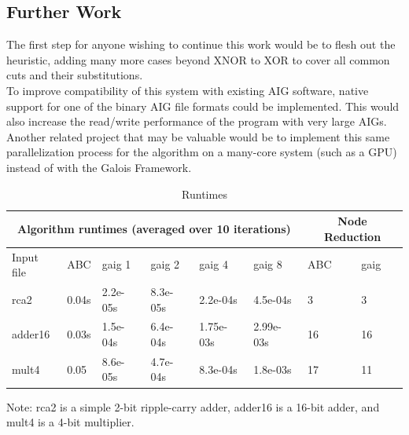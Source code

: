 \documentclass[twocolumn]{article}
\begin{document}
\subsection{Further Work}
The first step for anyone wishing to continue this work would be to flesh out the heuristic, adding many more cases beyond XNOR to XOR to cover all common cuts and their substitutions.\\\indent
To improve compatibility of this system with existing AIG software, native support for one of the binary AIG file formats could be implemented. This would also increase the read/write performance of the program with very large AIGs.\\\indent
Another related project that may be valuable would be to implement this same parallelization process for the algorithm on a many-core system (such as a GPU) instead of with the Galois Framework.


\onecolumn
\begin {table}[T]
\caption {Runtimes} \label{tab:title}
\begin{center}
\begin{tabular}{ |p{2cm}|p{2cm}|p{2cm}|p{2cm}|p{2cm}|p{2cm}|p{1cm}|p{1cm}| }
\hline
\multicolumn{6}{|c|}{Algorithm runtimes (averaged over 10 iterations)} & \multicolumn{2}{|c|}{Node Reduction}\\
\hline
Input file & ABC & gaig 1 & gaig 2 & gaig 4 & gaig 8 & ABC & gaig\\
\hline
rca2 & 0.04s & 2.2e-05s & 8.3e-05s & 2.2e-04s & 4.5e-04s & 3 & 3\\
adder16 & 0.03s & 1.5e-04s & 6.4e-04s & 1.75e-03s & 2.99e-03s & 16 & 16\\
mult4 & 0.05 & 8.6e-05s & 4.7e-04s & 8.3e-04s & 1.8e-03s & 17 & 11\\
\hline
\end{tabular}
Note: rca2 is a simple 2-bit ripple-carry adder, adder16 is a 16-bit adder, and mult4 is a 4-bit multiplier.
\end{center}
\end{table}
\end{document}
